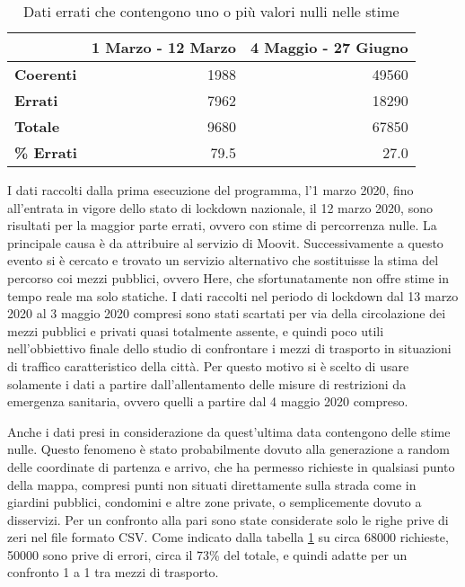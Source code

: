 \begin{table}[H]
\centering
\begin{tabular}{ | l | r | r | }
\hline

& \textbf{1 Marzo - 12 Marzo} & \textbf{4 Maggio - 27 Giugno} \\
\hline

\textbf{Coerenti}& 1988 & 49560 \\  
\textbf{Errati} & 7962 & 18290 \\
\hline
\textbf{Totale} & 9680 & 67850 \\
\textbf{\% Errati} & 79.5 & 27.0 \\
\hline
\end{tabular}
\caption{Dati errati che contengono uno o più valori nulli nelle stime}
\label{table:1}
\end{table}

I dati raccolti dalla prima esecuzione del programma, l'1 marzo 2020, fino all'entrata in vigore dello stato di lockdown nazionale, il 12 marzo 2020, sono risultati per la maggior parte errati, ovvero con stime di percorrenza nulle. La principale causa è da attribuire al servizio di Moovit. Successivamente a questo evento si è cercato e trovato un servizio alternativo che sostituisse la stima del percorso coi mezzi pubblici, ovvero Here, che sfortunatamente non offre stime in tempo reale ma solo statiche. I dati raccolti nel periodo di lockdown dal 13 marzo 2020 al 3 maggio 2020 compresi sono stati scartati per via della circolazione dei mezzi pubblici e privati quasi totalmente assente, e quindi poco utili nell'obbiettivo finale dello studio di confrontare i mezzi di trasporto in situazioni di traffico caratteristico della città. Per questo motivo si è scelto di usare solamente i dati a partire dall'allentamento delle misure di restrizioni da emergenza sanitaria, ovvero quelli a partire dal 4 maggio 2020 compreso.

Anche i dati presi in considerazione da quest'ultima data contengono delle stime nulle. Questo fenomeno è stato probabilmente dovuto alla generazione a random delle coordinate di partenza e arrivo, che ha permesso richieste in qualsiasi punto della mappa, compresi punti non situati direttamente sulla strada come in giardini pubblici, condomini e altre zone private, o semplicemente dovuto a disservizi. Per un confronto alla pari sono state considerate solo le righe prive di zeri nel file formato CSV. Come indicato dalla tabella \ref{table:1} su circa 68000 richieste, 50000 sono prive di errori, circa il 73\% del totale, e quindi adatte per un confronto 1 a 1 tra mezzi di trasporto.


